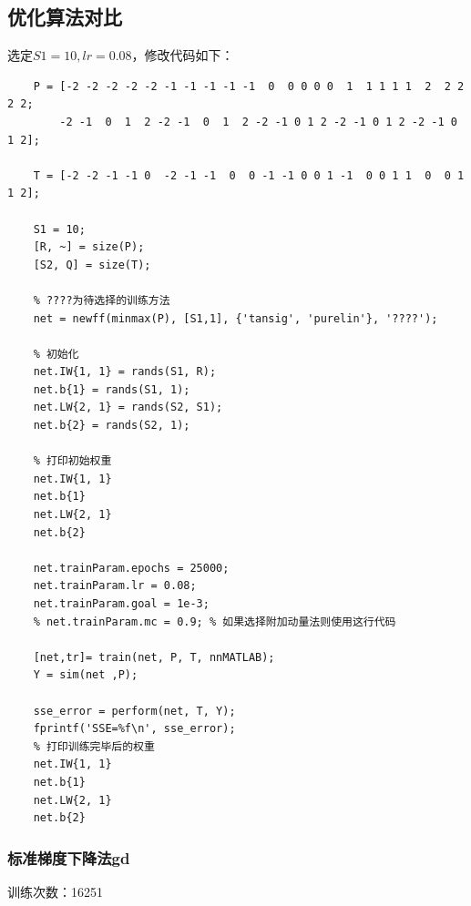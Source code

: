 \documentclass[UTF8]{article}
\begin{document}
\subsection{优化算法对比}
选定$S1=10, lr=0.08$，修改代码如下：
\begin{lstlisting}
    P = [-2 -2 -2 -2 -2 -1 -1 -1 -1 -1  0  0 0 0 0  1  1 1 1 1  2  2 2 2 2;
        -2 -1  0  1  2 -2 -1  0  1  2 -2 -1 0 1 2 -2 -1 0 1 2 -2 -1 0 1 2];

    T = [-2 -2 -1 -1 0  -2 -1 -1  0  0 -1 -1 0 0 1 -1  0 0 1 1  0  0 1 1 2];

    S1 = 10;
    [R, ~] = size(P);
    [S2, Q] = size(T);

    % ????为待选择的训练方法 
    net = newff(minmax(P), [S1,1], {'tansig', 'purelin'}, '????');

    % 初始化
    net.IW{1, 1} = rands(S1, R);
    net.b{1} = rands(S1, 1);
    net.LW{2, 1} = rands(S2, S1);
    net.b{2} = rands(S2, 1);

    % 打印初始权重
    net.IW{1, 1}
    net.b{1}
    net.LW{2, 1}
    net.b{2}

    net.trainParam.epochs = 25000;
    net.trainParam.lr = 0.08;
    net.trainParam.goal = 1e-3;
    % net.trainParam.mc = 0.9; % 如果选择附加动量法则使用这行代码

    [net,tr]= train(net, P, T, nnMATLAB); 
    Y = sim(net ,P);

    sse_error = perform(net, T, Y);
    fprintf('SSE=%f\n', sse_error);
    % 打印训练完毕后的权重
    net.IW{1, 1}
    net.b{1}
    net.LW{2, 1}
    net.b{2}

\end{lstlisting}
\subsubsection{标准梯度下降法gd}
训练次数：16251
\end{document}
